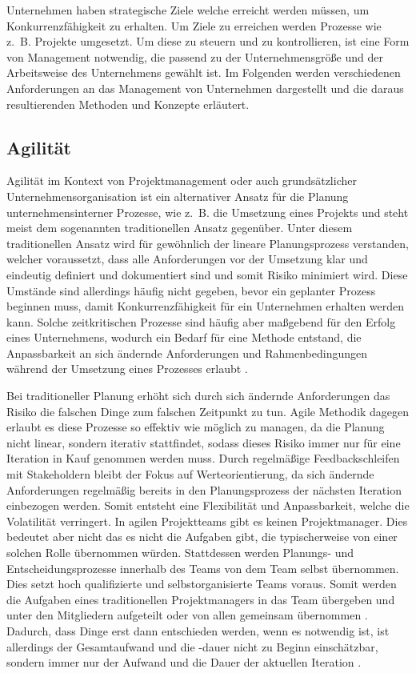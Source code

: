Unternehmen haben strategische Ziele welche erreicht werden müssen, um Konkurrenzfähigkeit zu erhalten. Um Ziele zu erreichen werden Prozesse wie z. B. Projekte umgesetzt. Um diese zu steuern und zu kontrollieren, ist eine Form von Management notwendig, die passend zu der Unternehmensgröße und der Arbeitsweise des Unternehmens gewählt ist. Im Folgenden werden verschiedenen Anforderungen an das Management von Unternehmen dargestellt und die daraus resultierenden Methoden und Konzepte erläutert.

\subsection{Agilität}
Agilität im Kontext von Projektmanagement oder auch grundsätzlicher Unternehmensorganisation ist ein alternativer Ansatz für die Planung unternehmensinterner Prozesse, wie z. B. die Umsetzung eines Projekts und steht meist dem sogenannten traditionellen Ansatz gegenüber. Unter diesem traditionellen Ansatz wird für gewöhnlich der lineare Planungsprozess verstanden, welcher voraussetzt, dass alle Anforderungen vor der Umsetzung klar und eindeutig definiert und dokumentiert sind und somit Risiko minimiert wird. Diese Umstände sind allerdings häufig nicht gegeben, bevor ein geplanter Prozess beginnen muss, damit Konkurrenzfähigkeit für ein Unternehmen erhalten werden kann. Solche zeitkritischen Prozesse sind häufig aber maßgebend für den Erfolg eines Unternehmens, wodurch ein Bedarf für eine Methode entstand, die Anpassbarkeit an sich ändernde Anforderungen und Rahmenbedingungen während der Umsetzung eines Prozesses erlaubt \cite{agilismVsTranditionalApproaches}.

Bei traditioneller Planung erhöht sich durch sich ändernde Anforderungen das Risiko die falschen Dinge zum falschen Zeitpunkt zu tun. Agile Methodik  dagegen erlaubt es diese Prozesse so effektiv wie möglich zu managen, da die Planung nicht linear, sondern iterativ stattfindet, sodass dieses Risiko immer nur für eine Iteration in Kauf genommen werden muss. Durch regelmäßige Feedbackschleifen mit Stakeholdern bleibt der Fokus auf Werteorientierung, da sich ändernde Anforderungen regelmäßig bereits in den Planungsprozess der nächsten Iteration einbezogen werden. Somit entsteht eine Flexibilität und Anpassbarkeit, welche die Volatilität verringert. In agilen Projektteams gibt es keinen Projektmanager. Dies bedeutet aber nicht das es nicht die Aufgaben gibt, die typischerweise von einer solchen Rolle übernommen würden. Stattdessen werden Planungs- und Entscheidungsprozesse innerhalb des Teams von dem Team selbst übernommen. Dies setzt hoch qualifizierte und selbstorganisierte Teams voraus. Somit werden die Aufgaben eines traditionellen Projektmanagers in das Team übergeben und unter den Mitgliedern aufgeteilt oder von allen gemeinsam übernommen \cite{TheRoleofProjectManagerinAgileSoftwareTeams}.
Dadurch, dass Dinge erst dann entschieden werden, wenn es notwendig ist, ist allerdings der Gesamtaufwand und die -dauer nicht zu Beginn einschätzbar, sondern immer nur der Aufwand und die Dauer der aktuellen Iteration \cite{agilismVsTranditionalApproaches}.

